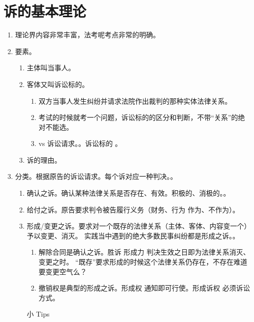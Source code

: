 \section{诉的基本理论}
\begin{enumerate}
  \item 理论界内容非常丰富，法考呢考点非常的明确。
  \item 要素。
        \begin{enumerate}
          \item 主体叫当事人。
          \item 客体又叫诉讼标的。
                \begin{enumerate}
                  \item 双方当事人发生纠纷并请求法院作出裁判的那种实体法律关系。
                  \item 考试的时候就考一个问题，诉讼标的的区分和判断，不带“关系”的绝对不能选。
                  \item vs 诉讼请求。。诉讼标的 \yjt {}。
                \end{enumerate}
          \item 诉的理由。
        \end{enumerate}
  \item 分类。根据原告的诉讼请求。每个诉对应一种判决。。
        \begin{enumerate}
          \item 确认之诉。确认某种法律关系是否存在、有效。积极的、消极的。。
          \item 给付之诉。原告要求判令被告履行义务（财务、行为 \yjt 作为、不作为）。
          \item 形成/变更之诉。要求对一个既存的法律关系（主体、客体、内容变一个）予以变更、消灭。
                实践当中遇到的绝大多数民事纠纷都是形成之诉。。
                \begin{enumerate}
                  \item 解除合同是确认之诉。胜诉 \yjt 形成力 \yjt 判决生效之日即为法律关系消灭、变更之时。
                        “既存”要求形成的时候这个法律关系仍存在，不存在难道要变更空气么？
                  \item 撤销权是典型的形成之诉。形成权 \yjt 通知即可行使。形成诉权 \yjt 必须诉讼方式。
                \end{enumerate}
                \begin{kk}{小 Tips}
                  \begin{enumerate}

\end{enumerate}
\end{kk}
\end{enumerate}
\end{enumerate}

